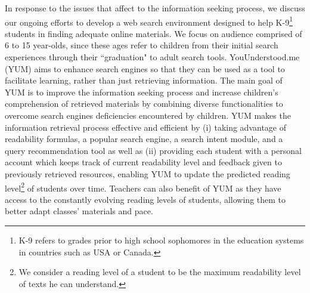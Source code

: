 \documentclass{sig-alternate-05-2015}
\begin{document}
In response to the issues that affect to the information seeking process,  we discuss our ongoing efforts to develop a web search environment designed to help K-9\footnote{ K-9 refers to grades prior to high school sophomores in the education systems in countries such as USA or Canada.} students in finding adequate online materials. We focus on audience comprised of 6 to 15 year-olds, since these ages refer to children from their initial search experiences through their ``graduation" to adult search tools. YouUnderstood.me (YUM) aims to enhance search engines so that they can be used as a tool to facilitate learning, rather than just retrieving information. The main goal of YUM is to improve the information seeking process and increase children's comprehension of retrieved materials by combining diverse functionalities to overcome search engines deficiencies encountered by children. YUM makes the information retrieval process effective and efficient by (i) taking advantage of readability formulas, a popular search engine, a search intent module, and a query recommendation tool as well as (ii) providing each student with a personal account which keeps track of current readability level and feedback given to previously retrieved resources, enabling YUM to update the predicted reading  level\footnote{We consider a reading level of a student to be the maximum readability level of texts he can understand.} of students over time.  Teachers can also benefit of YUM  as they have access to the constantly evolving reading levels of students, allowing them to better adapt classes' materials and pace. 
\end{document}
